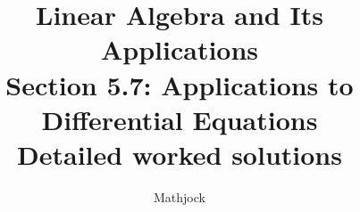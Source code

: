 
\title{\textbf{Linear Algebra and Its Applications}\\[0.3em]Section 5.7: Applications to Differential Equations\\[0.3em]\large Detailed worked solutions}
\author{Mathjock}
\date{}

\maketitle
\bookinfo
\tableofcontents
\clearpage
\renewcommand{\thesection}{5.\arabic{section}}
\renewcommand{\theHsection}{5.\arabic{section}}
\setcounter{section}{6}


